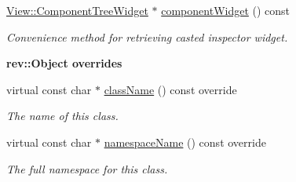 \begin{Indent}
\begin{DoxyCompactItemize}
\mbox{\label{classrev_1_1_view_1_1_component_item_a6bcbc2d1a73de3ba487038a3a586df90}} 
\mbox{\hyperlink{classrev_1_1_view_1_1_component_tree_widget}{View\+::\+Component\+Tree\+Widget}} $\ast$ \mbox{\hyperlink{classrev_1_1_view_1_1_component_item_a6bcbc2d1a73de3ba487038a3a586df90}{component\+Widget}} () const
\begin{DoxyCompactList}\small\item\em Convenience method for retrieving casted inspector widget. \end{DoxyCompactList}\end{DoxyCompactItemize}
\end{Indent}
\begin{Indent}\textbf{ rev\+::Object overrides}\par
\begin{DoxyCompactItemize}
\item 
virtual const char $\ast$ \mbox{\hyperlink{classrev_1_1_view_1_1_component_item_ab841f5681c0a147d32680d0f3a1f62e7}{class\+Name}} () const override
\begin{DoxyCompactList}\small\item\em The name of this class. \end{DoxyCompactList}\item 
virtual const char $\ast$ \mbox{\hyperlink{classrev_1_1_view_1_1_component_item_a75651a2035c376c2fa679eb614b430a3}{namespace\+Name}} () const override
\begin{DoxyCompactList}\small\item\em The full namespace for this class. \end{DoxyCompactList}\end{DoxyCompactItemize}
\end{Indent}
